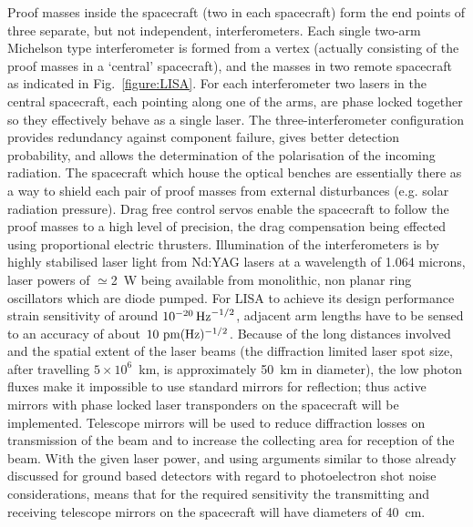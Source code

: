 \documentclass{article}
\begin{document}
Proof masses inside the spacecraft (two in each spacecraft) form the end points
of three separate, but not independent, interferometers. Each single two-arm 
Michelson type interferometer is formed from a vertex (actually consisting of
the proof masses in a `central' spacecraft), and the masses in two remote
spacecraft as indicated in Fig.~\ref{figure:LISA}. For each interferometer 
two lasers in the central spacecraft, each pointing along one of the arms,
are phase locked together so they effectively behave as a single laser. The 
three-interferometer configuration provides redundancy against component
failure, gives better detection probability, and allows the determination of the
polarisation of the incoming radiation. The spacecraft which house the optical benches
are essentially there as a way to shield each pair of proof masses from external disturbances (e.g.
solar radiation pressure). Drag free control servos enable the spacecraft to
follow the proof masses to a high level of precision, the drag compensation
being effected using proportional electric thrusters. Illumination of the
interferometers is by highly stabilised laser light from Nd:YAG lasers at a
wavelength of 1.064 microns, laser powers of $\simeq$2~W being available from
monolithic, non planar ring oscillators which are diode pumped.  For LISA
to achieve its design performance strain sensitivity of around $10^{-20}\,{\rm
Hz}^{-1/2}$, adjacent arm lengths have to be sensed to an accuracy of about $10
{\rm \ pm}(\rm Hz)^{-1/2}$. Because of the long distances involved and the
spatial extent of the laser beams (the diffraction limited laser spot size,
after travelling $5\times10^{6}$~km, is approximately 50~km in diameter), the
low photon fluxes make it impossible to use standard mirrors for reflection;
thus active mirrors with phase locked laser transponders on the spacecraft will
be implemented. Telescope mirrors will be used to reduce diffraction losses on
transmission of the beam and to increase the collecting area for reception of
the beam. With the given laser power, and using arguments similar to those already 
discussed for ground based detectors with regard to photoelectron shot noise 
considerations, means that for the required sensitivity the transmitting and 
receiving telescope mirrors on the spacecraft will have diameters of 40~cm.

\end{document}
